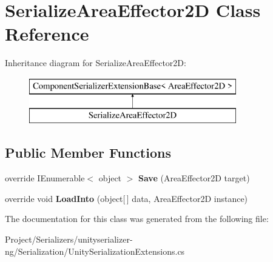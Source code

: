 \hypertarget{class_serialize_area_effector2_d}{}\section{Serialize\+Area\+Effector2D Class Reference}
\label{class_serialize_area_effector2_d}
Inheritance diagram for Serialize\+Area\+Effector2D\+:\begin{figure}[H]
\begin{center}
\leavevmode
\includegraphics[height=2.000000cm]{class_serialize_area_effector2_d}
\end{center}
\end{figure}
\subsection*{Public Member Functions}
\begin{DoxyCompactItemize}
\item 
\mbox{\label{class_serialize_area_effector2_d_a5d668a4b846f9371ddf87dc74d845d22}} 
override I\+Enumerable$<$ object $>$ {\bfseries Save} (Area\+Effector2D target)
\item 
\mbox{\label{class_serialize_area_effector2_d_ada592141d2f3deee413dc4b88389363d}} 
override void {\bfseries Load\+Into} (object\mbox{[}$\,$\mbox{]} data, Area\+Effector2D instance)
\end{DoxyCompactItemize}


The documentation for this class was generated from the following file\+:\begin{DoxyCompactItemize}
\item 
Project/\+Serializers/unityserializer-\/ng/\+Serialization/Unity\+Serialization\+Extensions.\+cs\end{DoxyCompactItemize}
